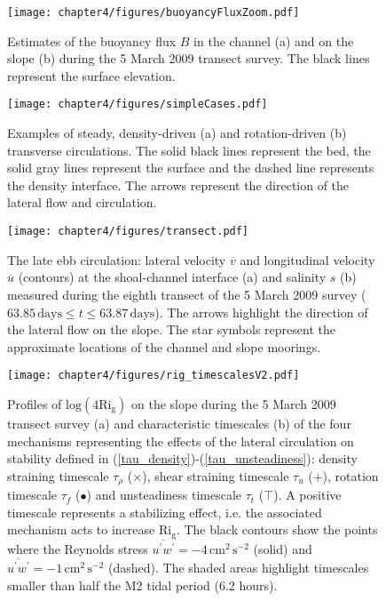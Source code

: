 \begin{figure}[t]
  \noindent
  \texttt{[image: chapter4/figures/buoyancyFluxZoom.pdf]}\\
  \caption{Estimates of the buoyancy flux $B$ in the channel (a) and on the slope (b) during the 5 March 2009 transect survey. The black lines represent the surface elevation.}
  \label{buoyancyFluxZoom}
\end{figure}

\begin{figure}[t]
  \noindent
  \texttt{[image: chapter4/figures/simpleCases.pdf]}\\
  \caption{Examples of steady, density-driven (a) and rotation-driven (b) transverse circulations. The solid black lines represent the bed, the solid gray lines represent the surface and the dashed line represents the density interface. The arrows represent the direction of the lateral flow and circulation.}
  \label{simpleCases}
\end{figure}

\begin{figure}[t]
  \noindent
  \texttt{[image: chapter4/figures/transect.pdf]}\\
  \caption{The late ebb circulation: lateral velocity $\overline{v}$ and longitudinal velocity $\overline{u}$ (contours) at the shoal-channel interface (a) and salinity $s$ (b) measured during the eighth transect of the 5 March 2009 survey ($63.85\,\mathrm{days} \leq t \leq 63.87\,\mathrm{days}$). The arrows highlight the direction of the lateral flow on the slope. The star symbols represent the approximate locations of the channel and slope moorings.}
  \label{transect}
\end{figure}

\begin{figure}[t]
  \noindent
  \texttt{[image: chapter4/figures/rig\_timescalesV2.pdf]}\\
  \caption{Profiles of $\mathrm{log(4Ri_g)}$ on the slope during the 5 March 2009 transect survey (a) and 
  characteristic timescales (b) of the four mechanisms representing the effects of the lateral circulation on stability defined in (\ref{tau_density})-(\ref{tau_unsteadiness}): density straining timescale $\tau_{\rho}$ ($\times$), shear straining timescale $\tau_{u}$ ($+$), rotation timescale $\tau_f$ ($\bullet$) and unsteadiness timescale $\tau_t$ ($\top$). A positive timescale represents a stabilizing effect, i.e. the associated mechanism acts to increase $\mathrm{Ri_g}$. The black contours show the points where the Reynolds stress $\overline{u^{\prime} w^{\prime}} = - 4 \, \mathrm{cm^2\,s^{-2}}$ (solid) and $\overline{u^{\prime} w^{\prime}} = - 1 \, \mathrm{cm^2\,s^{-2}}$ (dashed). The shaded areas highlight timescales smaller than half the M2 tidal period (6.2 hours).}
  \label{rigTimescales}
\end{figure}

